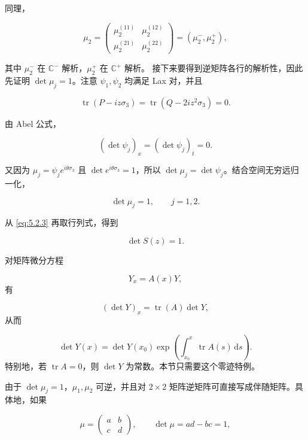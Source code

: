 \documentclass[
    lang=cn,
    scheme=chinese,
    mode=simple,
    device=normal,
    color=blue,
    math=cm,
    thmcnt=section,
    12pt,
    nowatermark
]{elegantbook}
\begin{document}
同理，

\begin{equation}
    \mu_2
    =
    \begin{pmatrix}
        \mu_2^{(11)} & \mu_2^{(12)} \\
        \mu_2^{(21)} & \mu_2^{(22)}
    \end{pmatrix}
    =
    (\mu_2^-,\mu_2^+),
    \tag{5.2.19}
    \label{eq:5.2.19}
\end{equation}

其中 $\mu_2^-$ 在 $\mathbb{C}^-$ 解析，$\mu_2^+$ 在 $\mathbb{C}^+$ 解析。
接下来要得到逆矩阵各行的解析性，因此先证明 $\det\mu_j=1$。注意 $\psi_1,\psi_2$ 均满足 Lax 对，并且

\[
    \operatorname{tr}(P-iz\sigma_3)
    =
    \operatorname{tr}(Q-2iz^2\sigma_3)
    =
    0.
\]

由 Abel 公式，

\begin{equation}
    (\det\psi_j)_x
    =
    (\det\psi_j)_t
    =
    0.
    \tag{5.2.20}
    \label{eq:5.2.20}
\end{equation}

又因为 $\mu_j=\psi_je^{i\theta\sigma_3}$ 且 $\det e^{i\theta\sigma_3}=1$，所以 $\det\mu_j=\det\psi_j$。结合空间无穷远归一化，

\begin{equation}
    \det\mu_j=1,\qquad j=1,2.
    \tag{5.2.21}
    \label{eq:5.2.21}
\end{equation}

从 \eqref{eq:5.2.3} 再取行列式，得到

\[
    \det S(z)=1.
\]

\begin{callout}
    对矩阵微分方程

    \[
        Y_x=A(x)Y,
    \]
    有

    \[
        (\det Y)_x=\operatorname{tr}(A)\det Y,
    \]
    从而

    \[
        \det Y(x)
        =
        \det Y(x_0)
        \exp\!\left(\int_{x_0}^{x}\operatorname{tr}A(s)\,\mathrm ds\right).
    \]
    特别地，若 $\operatorname{tr}A=0$，则 $\det Y$ 为常数。本节只需要这个零迹特例。
\end{callout}

由于 $\det\mu_j=1$，$\mu_1,\mu_2$ 可逆，并且对 $2\times2$ 矩阵逆矩阵可直接写成伴随矩阵。具体地，如果

\[
    \mu=
    \begin{pmatrix}
        a & b \\
        c & d
    \end{pmatrix},
    \qquad
    \det\mu=ad-bc=1,
\]
\end{document}
